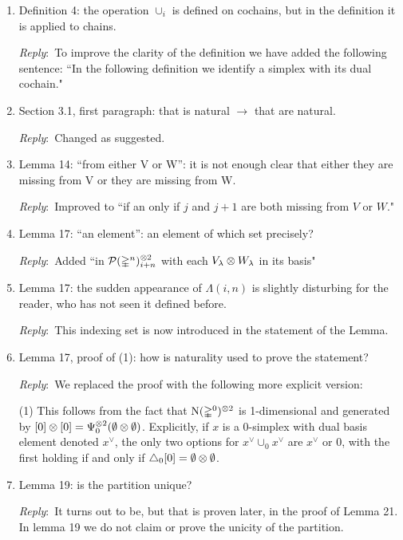 \documentclass{amsart}
\newcommand{\ar}{\medskip\noindent\textit{Reply}:\ }
\begin{document}
	\begin{enumerate}
		\item Definition 4: the operation \(\cup_i\) is defined on cochains, but in the definition it is applied to chains.

		\ar To improve the clarity of the definition we have added the following sentence: ``In the following definition we identify a simplex with its dual cochain."

		\item Section 3.1, first paragraph: that is natural \(\rightarrow\) that are natural.

		\ar Changed as suggested.

		\item Lemma 14: “from either V or W”: it is not enough clear that either they are missing from V or they are missing from W.

		\ar Improved to ``if an only if $j$ and $j+1$ are both missing from $V$ or $W$."

		\item Lemma 17: “an element”: an element of which set precisely?

		\ar Added ``in $\mathcal{P}(\mathbb{\Delta}^n)^{\otimes 2}_{i+n}$ with each $V_\lambda \otimes W_\lambda$ in its basis"

		\item Lemma 17: the sudden appearance of \(\Lambda(i, n)\) is slightly disturbing for the reader, who has not seen it defined before.

		\ar This indexing set is now introduced in the statement of the Lemma.

		\item Lemma 17, proof of (1): how is naturality used to prove the statement?

		\ar We replaced the proof with the following more explicit version:

		\noindent (1) This follows from the fact that $\operatorname{N}(\mathbb{\Delta}^0)^{\otimes 2}$ is 1-dimensional and generated by $[0] \otimes [0] = \Psi_0^{\otimes 2} (\emptyset \otimes \emptyset)$.
		Explicitly, if $x$ is a $0$-simplex with dual basis element denoted $x^\vee$, the only two options for $x^\vee \cup_0 x^\vee$ are $x^\vee$ or $0$, with the first holding if and only if $\triangle_0[0] = \emptyset \otimes \emptyset$.

		\item Lemma 19: is the partition unique?

		\ar It turns out to be, but that is proven later, in the proof of Lemma 21.
		In lemma 19 we do not claim or prove the unicity of the partition.


\end{enumerate}
\end{document}

